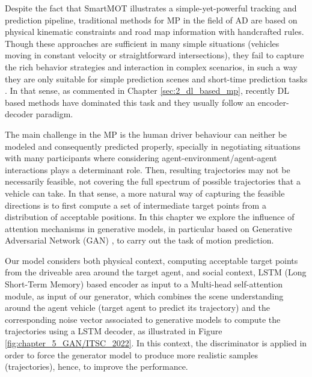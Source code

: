 Despite the fact that SmartMOT illustrates a simple-yet-powerful tracking and prediction pipeline, traditional methods for \ac{MP} in the field of \ac{AD} are based on physical kinematic constraints and road map information with handcrafted rules. Though these approaches are sufficient in many simple situations (\ie vehicles moving in constant velocity or straightforward intersections), they fail to capture the rich behavior strategies and interaction in complex scenarios, in such a way they are only suitable for simple prediction scenes and short-time prediction tasks \cite{huang2022survey}. In that sense, as commented in Chapter \ref{sec:2_dl_based_mp}, recently \ac{DL} based methods have dominated this task and they usually follow an encoder-decoder paradigm. 

The main challenge in the \ac{MP} is the human driver behaviour can neither be modeled and consequently predicted properly, specially in negotiating situations \cite{gomez2021train} \cite{mercat2020multi} with many participants where considering agent-environment/agent-agent interactions \cite{sadeghian2019sophie} plays a determinant role. Then, resulting trajectories may not be necessarily feasible, not covering the full spectrum of possible trajectories that a vehicle can take. In that sense, a more natural way of capturing the feasible directions \cite{dendorfer2020goal} is to first compute a set of intermediate target points from a distribution of acceptable positions. In this chapter we explore the influence of attention mechanisms in generative models, in particular based on Generative Adversarial Network (GAN) \cite{goodfellow2020generative}, to carry out the task of motion prediction. 

Our model considers both physical context, computing acceptable target points from the driveable area around the target agent, and social context, LSTM (Long Short-Term Memory) \cite{hochreiter1997long} based encoder as input to a Multi-head self-attention module, as input of our generator, which combines the scene understanding around the agent vehicle (target agent to predict its trajectory) and the corresponding noise vector associated to generative models to compute the trajectories using a LSTM decoder, as illustrated in Figure \ref{fig:chapter_5_GAN/ITSC_2022}. In this context, the discriminator is applied in order to force the generator model to produce more realistic samples (\ie trajectories), hence, to improve the performance. 

